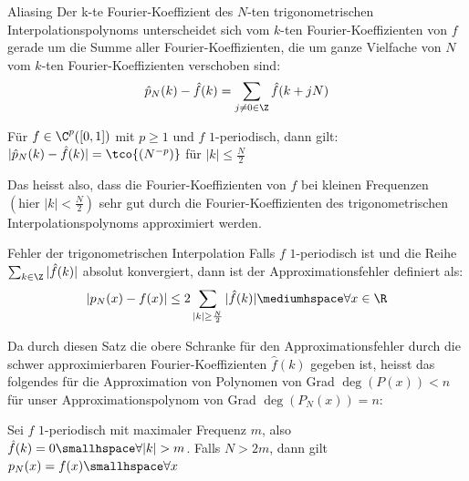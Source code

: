 \setcounter{all}{6}
\begin{theorem}[]{Aliasing}
    Der k-te Fourier-Koeﬃzient des $N$-ten trigonometrischen Interpolationspolynoms unterscheidet sich vom $k$-ten Fourier-Koeffizienten von $f$ 
    gerade um die Summe aller Fourier-Koeffizienten, die um ganze Vielfache von $N$ vom $k$-ten Fourier-Koeffizienten verschoben sind:
    \begin{align*}
        \hat{p}_N(k) - \hat{f}(k) = \sum_{j \neq 0 \in \Z} \hat{f}(k + jN)
    \end{align*}
\end{theorem}

\inlinecorollary Für $f \in \C^p([0, 1])$ mit $p \geq 1$ und $f$ $1$-periodisch, dann gilt: $|\hat{p}_N(k) - \hat{f}(k)| = \tco{(N^{-p})}$ für $|k| \leq \frac{N}{2}$

Das heisst also, dass die Fourier-Koeffizienten von $f$ bei kleinen Frequenzen $\left( \text{hier } |k| < \frac{N}{2} \right)$
sehr gut durch die Fourier-Koeffizienten des trigonometrischen Interpolationspolynoms approximiert werden.

\begin{theorem}[]{Fehler der trigonometrischen Interpolation}
    Falls $f$ $1$-periodisch ist und die Reihe $\sum_{k \in \Z} |\hat{f}(k)|$ absolut konvergiert, dann ist der Approximationsfehler definiert als:
    \begin{align*}
        |p_N(x) - f(x)| \leq 2 \sum_{|k| \geq \frac{N}{2}} |\hat{f}(k)| \mediumhspace \forall x \in \R
    \end{align*}
\end{theorem}
Da durch diesen Satz die obere Schranke für den Approximationsfehler durch die schwer approximierbaren Fourier-Koeffizienten $\hat{f}(k)$ gegeben ist,
heisst das folgendes für die Approximation von Polynomen von Grad $\deg(P(x)) < n$ für unser Approximationspolynom von Grad $\deg(P_N(x)) = n$:

 Sei $f$ $1$-periodisch mit maximaler Frequenz $m$, also $\hat{f}(k) = 0 \smallhspace \forall |k| > m$. Falls $N > 2m$, dann gilt $p_N(x) = f(x) \smallhspace \forall x$

